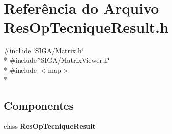 \section{Referência do Arquivo Res\+Op\+Tecnique\+Result.\+h}
\label{_2_tecniques_2_res_op_tecnique_result_8h}
{\ttfamily \#include \char`\"{}S\+I\+G\+A/\+Matrix.\+h\char`\"{}}\\*
{\ttfamily \#include \char`\"{}S\+I\+G\+A/\+Matrix\+Viewer.\+h\char`\"{}}\\*
{\ttfamily \#include $<$map$>$}\\*
\subsection*{Componentes}
\begin{DoxyCompactItemize}
\item 
class {\bf Res\+Op\+Tecnique\+Result}
\end{DoxyCompactItemize}
